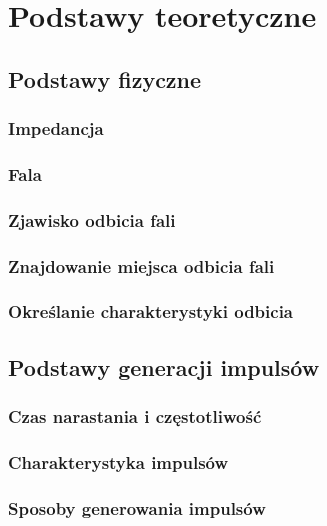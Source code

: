 \newpage
\section{Podstawy teoretyczne}

\subsection{Podstawy fizyczne}
\subsubsection{Impedancja}
\subsubsection{Fala}
\subsubsection{Zjawisko odbicia fali}
\subsubsection{Znajdowanie miejsca odbicia fali}
\subsubsection{Określanie charakterystyki odbicia}

\subsection{Podstawy generacji impulsów}
\subsubsection{Czas narastania i częstotliwość}
\subsubsection{Charakterystyka impulsów}
\subsubsection{Sposoby generowania impulsów}
